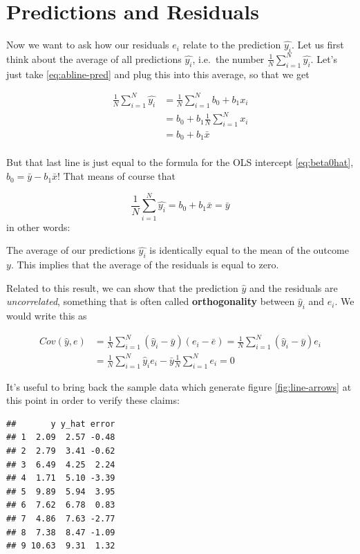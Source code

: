\documentclass[]{book}
\newenvironment{tip}{\begin{tcolorbox}[colback=green!5!white,colframe=green]}{\end{tcolorbox}}
\begin{document}
\section{Predictions and Residuals}\label{pred-resids}

Now we want to ask how our residuals \(e_i\) relate to the prediction
\(\hat{y_i}\). Let us first think about the average of all predictions
\(\hat{y_i}\), i.e.~the number \(\frac{1}{N} \sum_{i=1}^N \hat{y_i}\).
Let's just take \eqref{eq:abline-pred} and plug this into this average, so
that we get

\begin{align}
\frac{1}{N} \sum_{i=1}^N \hat{y_i} &= \frac{1}{N} \sum_{i=1}^N b_0 + b_1 x_i \\
&= b_0 + b_1  \frac{1}{N} \sum_{i=1}^N x_i \\
&= b_0 + b_1  \bar{x} \\
\end{align}

But that last line is just equal to the formula for the OLS intercept
\eqref{eq:beta0hat}, \(b_0 = \bar{y} - b_1 \bar{x}\)! That means of course
that

\[
\frac{1}{N} \sum_{i=1}^N \hat{y_i}  = b_0 + b_1  \bar{x} = \bar{y}
\] in other words:

\begin{tip}
The average of our predictions \(\hat{y_i}\) is identically equal to the
mean of the outcome \(y\). This implies that the average of the
residuals is equal to zero.
\end{tip}

 Related to this result, we can show that the prediction \(\hat{y}\) and
the residuals are \emph{uncorrelated}, something that is often called
\textbf{orthogonality} between \(\hat{y}_i\) and \(e_i\). We would write
this as

\begin{align}
Cov(\hat{y},e) &=\frac{1}{N} \sum_{i=1}^N (\hat{y}_i-\bar{y})(e_i-\bar{e}) =   \frac{1}{N} \sum_{i=1}^N (\hat{y}_i-\bar{y})e_i \\
&=  \frac{1}{N} \sum_{i=1}^N \hat{y}_i e_i-\bar{y} \frac{1}{N} \sum_{i=1}^N e_i = 0
\end{align}

It's useful to bring back the sample data which generate figure
\ref{fig:line-arrows} at this point in order to verify these claims:

\begin{verbatim}
##       y y_hat error
## 1  2.09  2.57 -0.48
## 2  2.79  3.41 -0.62
## 3  6.49  4.25  2.24
## 4  1.71  5.10 -3.39
## 5  9.89  5.94  3.95
## 6  7.62  6.78  0.83
## 7  4.86  7.63 -2.77
## 8  7.38  8.47 -1.09
## 9 10.63  9.31  1.32
\end{verbatim}
\end{document}
